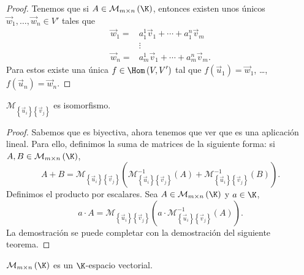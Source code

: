 \begin{proof}
Tenemos que si $\displaystyle A \in \mathcal{M}_{m\times n}\left(\K\right) $, entonces existen unos únicos $\displaystyle \vec{w}_{1}, \ldots, \vec{w}_{n}\in V' $ tales que 
\[
\begin{split}
	\vec{w}_{1} = & a^{1}_{1}\vec{v}_{1} + \cdots + a^{n}_{1}\vec{v}_{m} \\
		      & \vdots \\
	\vec{w}_{n}= & a^{1}_{m}\vec{v}_{1} + \cdots + a^{n}_{m}\vec{v}_{m} .
\end{split}
\]
Para estos existe una única $\displaystyle f \in \Hom\left(V, V'\right) $ tal que $\displaystyle f\left(\vec{u}_{1}\right) = \vec{w}_{1} $, \ldots, $\displaystyle f\left(\vec{u}_{n}\right) = \vec{w}_{n} $.
\end{proof}

\begin{ftheorem}[]
	\normalfont $\displaystyle \mathcal{M}_{ \left\{ \vec{u}_{i}\right\} \left\{ \vec{v}_{j}\right\} } $ es isomorfismo.
\end{ftheorem}

\begin{proof}
Sabemos que es biyectiva, ahora tenemos que ver que es una aplicación lineal. Para ello, definimos la suma de matrices de la siguiente forma: si $\displaystyle A, B \in \mathcal{M}_{m \times n}\left(\K\right) $,
\[ A + B = \mathcal{M}_{ \left\{ \vec{u}_{i}\right\} \left\{ \vec{v}_{j}\right\} }\left(\mathcal{M}^{-1}_{ \left\{ \vec{u}_{i}\right\} \left\{ \vec{v}_{j}\right\}}\left(A\right) + \mathcal{M}^{-1}_{ \left\{ \vec{u}_{i}\right\} \left\{ \vec{v}_{j}\right\}}\left(B\right)\right).\]
Definimos el producto por escalares. Sea $\displaystyle A \in \mathcal{M}_{m \times n}\left(\K\right) $ y $\displaystyle a \in \K $, 
\[a \cdot A = \mathcal{M}_{ \left\{ \vec{u}_{i}\right\} \left\{ \vec{v}_{j}\right\} }\left(a \cdot \mathcal{M}^{-1}_{ \left\{ \vec{u}_{i}\right\} \left\{ \vec{v}_{j}\right\} }\left(A\right)\right) .\]
La demostración se puede completar con la demostración del siguiente teorema.
\end{proof}
\begin{ftheorem}[]
\normalfont $\displaystyle \mathcal{M}_{m \times n}\left(\K\right) $ es un $\displaystyle \K $-espacio vectorial.
\end{ftheorem}

